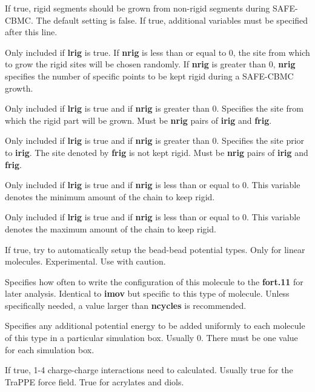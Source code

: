 \documentclass[12pt,letterpaper]{article}
\begin{document}
 If true, rigid segments should be grown from non-rigid segments 
during SAFE-CBMC.  The default setting is false.
If true, additional variables must be specified after this line.

 Only included if {\textbf{lrig}} is true.
If {\textbf{nrig}} is less than or equal to 0, the site from which to grow the rigid sites will be chosen randomly.
If {\textbf{nrig}} is greater than 0, {\textbf{nrig}} specifies the number of specific points to be kept rigid during
a SAFE-CBMC growth.

 Only included if {\textbf{lrig}} is true and 
if {\textbf{nrig}} is greater than 0.
Specifies the site from which the rigid part will be grown.
Must be {\textbf{nrig}} pairs of {\textbf{irig}} and {\textbf{frig}}.

 Only included if {\textbf{lrig}} is true and 
if {\textbf{nrig}} is greater than 0.
Specifies the site prior to {\textbf{irig}}.  The site denoted by 
{\textbf{frig}} is not kept rigid.
Must be {\textbf{nrig}} pairs of {\textbf{irig}} and {\textbf{frig}}.

 Only included if {\textbf{lrig}} is true and 
if {\textbf{nrig}} is less than or equal to 0.
This variable denotes the minimum amount of the chain to keep rigid.

 Only included if {\textbf{lrig}} is true and 
if {\textbf{nrig}} is less than or equal to 0.
This variable denotes the maximum amount of the chain to keep rigid.

 If true, try to automatically setup the bead-bead
potential types.  Only for linear molecules.  Experimental.  Use with caution.

 Specifies how often to write the configuration of this molecule 
to the {\textbf{fort.11}} for later analysis.
Identical to {\textbf{imov}} but specific to this type of molecule.
Unless specifically needed, a value larger than {\textbf {ncycles}} is recommended.

 Specifies any additional potential energy to be added 
uniformly to each molecule of this type in a particular simulation box.  Usually 0.
There must be one value for each simulation box.

 If true, 1-4 charge-charge interactions need to calculated. 
Usually true for the TraPPE force field.  True for acrylates and diols.
\end{document}
